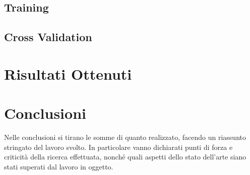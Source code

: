 \documentclass[12pt,italian]{report}
\begin{document}
\subsection{Training}



\subsection{Cross Validation}



\section{Risultati Ottenuti}
\label{sec:risultati}


% 
% 
\section{Conclusioni}

Nelle conclusioni si tirano le somme di quanto realizzato, facendo un riassunto stringato del lavoro svolto. In particolare vanno dichiarati punti di forza e criticità della ricerca effettuata, nonché quali aspetti dello stato dell'arte siano stati superati dal lavoro in oggetto.

%
%



\end{document}
